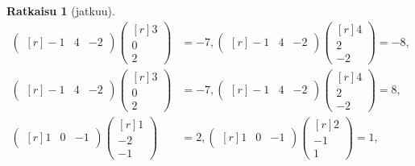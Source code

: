\documentclass[12pt, a4paper, t]{beamer}
\theoremstyle{exercise}
\theoremstyle{remark}
\theoremstyle{definition}
\newtheorem*{rat}{Ratkaisu}
\begin{document}
\begin{frame}
\vspace{90pt}
\begin{rat}[jatkuu]
\begin{align*}
\begin{pmatrix*}[r]
-1 & 4 &-2
\end{pmatrix*}
\begin{pmatrix*}[r]
3\\
0\\
2
\end{pmatrix*}&=-7, 
\begin{pmatrix*}[r]
-1 & 4 &-2
\end{pmatrix*}
\begin{pmatrix*}[r]
4\\
2\\
-2
\end{pmatrix*}=-8,\\
\begin{pmatrix*}[r]
-1 & 4 &-2
\end{pmatrix*}
\begin{pmatrix*}[r]
3\\
0\\
2
\end{pmatrix*}&=-7,
\begin{pmatrix*}[r]
-1 & 4 &-2
\end{pmatrix*}
\begin{pmatrix*}[r]
4\\
2\\
-2
\end{pmatrix*}=8,\\
\begin{pmatrix*}[r]
1 & 0 &-1
\end{pmatrix*}
\begin{pmatrix*}[r]
1\\
-2\\
-1
\end{pmatrix*}&=2, 
\begin{pmatrix*}[r]
1 & 0 &-1
\end{pmatrix*}
\begin{pmatrix*}[r]
2\\
-1\\
1
\end{pmatrix*}=1,\\
\end{align*}

\end{rat}

\end{frame}
\end{document}
